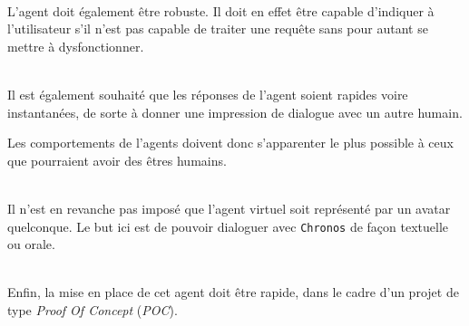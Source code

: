 ~\\\indent
L'agent doit également être robuste. Il doit en effet être capable d'indiquer à l'utilisateur s'il n'est pas capable de traiter une requête sans pour autant se mettre à dysfonctionner.

~\\\indent 
Il est également souhaité que les réponses de l'agent soient rapides voire instantanées, de sorte à donner une impression de dialogue avec un autre humain. 

Les comportements de l'agents doivent donc s'apparenter le plus possible à ceux que pourraient avoir des êtres humains.

~\\\indent
Il n'est en revanche pas imposé que l'agent virtuel soit représenté par un avatar quelconque. Le but ici est de pouvoir dialoguer avec \texttt{Chronos} de façon textuelle ou orale.

~\\\indent 
Enfin, la mise en place de cet agent doit être rapide, dans le cadre d'un projet de type \emph{Proof Of Concept} (\emph{POC}).


